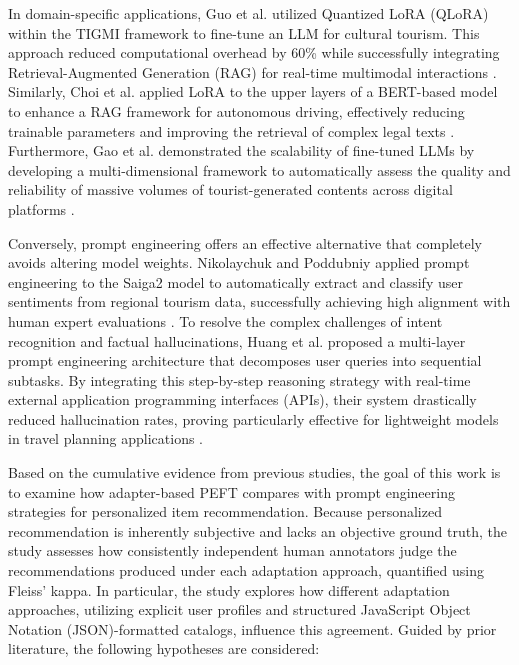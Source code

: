 \documentclass[journal,article,submit,pdftex,moreauthors]{Definitions/mdpi}
\begin{document}
In domain-specific applications, Guo et al. utilized Quantized LoRA (QLoRA) within the TIGMI framework to fine-tune an LLM for cultural tourism. This approach reduced computational overhead by 60\% while successfully integrating Retrieval-Augmented Generation (RAG) for real-time multimodal interactions \citep{guo2025interactive}. Similarly, Choi et al. applied LoRA to the upper layers of a BERT-based model to enhance a RAG framework for autonomous driving, effectively reducing trainable parameters and improving the retrieval of complex legal texts \citep{choi2025enhanced}. Furthermore, Gao et al. demonstrated the scalability of fine-tuned LLMs by developing a multi-dimensional framework to automatically assess the quality and reliability of massive volumes of tourist-generated contents across digital platforms \citep{gao2025quality}.

Conversely, prompt engineering offers an effective alternative that completely avoids altering model weights. Nikolaychuk and Poddubniy applied prompt engineering to the Saiga2 model to automatically extract and classify user sentiments from regional tourism data, successfully achieving high alignment with human expert evaluations \citep{nikolaychuk2024analysis}. To resolve the complex challenges of intent recognition and factual hallucinations, Huang et al. proposed a multi-layer prompt engineering architecture that decomposes user queries into sequential subtasks. By integrating this step-by-step reasoning strategy with real-time external application programming interfaces (APIs), their system drastically reduced hallucination rates, proving particularly effective for lightweight models in travel planning applications \citep{huang2025multi}.

Based on the cumulative evidence from previous studies, the goal of this work is to examine how adapter-based PEFT compares with prompt engineering strategies for personalized item recommendation. Because personalized recommendation is inherently subjective and lacks an objective ground truth, the study assesses how consistently independent human annotators judge the recommendations produced under each adaptation approach, quantified using Fleiss' kappa. In particular, the study explores how different adaptation approaches, utilizing explicit user profiles and structured JavaScript Object Notation (JSON)-formatted catalogs, influence this agreement. Guided by prior literature, the following hypotheses are considered:
\end{document}
